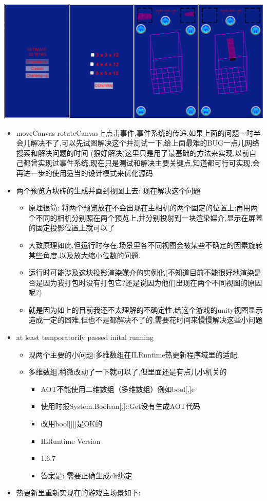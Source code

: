 \documentclass[9pt, b5paper]{article}
\begin{document}
\includegraphics[width=.9\linewidth]{./pic/readme_20221022_223927.png}
\begin{itemize}
\item moveCanvas rotateCanvas上点击事件,事件系统的传递.如果上面的问题一时半会儿解决不了,可以先试图解决这个并测试一下,给上面最难的BUG一点儿网络搜索和解决问题的时间 (狠好解决)这里只是用了最基础的方法来实现,以前自己都曾实现过事件系统,现在只是测试和解决主要关键点,知道都可行可实现,会再进一步的使用适当的设计模式来优化源码
\item 两个预览方块砖的生成并画到视图上去: 现在解决这个问题
\begin{itemize}
\item 原理很简: 将两个预览放在不会出现在主相机的两个固定的位置上;再用两个不同的相机分别照在两个预览上,并分别投射到一块渲染媒介,显示在屏幕的固定投影位置上就可以了
\item 大致原理如此,但运行时存在:场景里各不同视图会被某些不确定的因素旋转某些角度,以及放大缩小位数的问题.
\item 运行时可能涉及这块投影渲染媒介的实例化(不知道目前不能很好地渲染是否是因为我打包时没有打包它?还是说因为他们出现在两个不同视图的原因呢?)
\item 就是因为如上的目前我还不太理解的不确定性,给这个游戏的unity视图显示造成一定的困难,但也不是都解决不了的,需要花时间来慢慢解决这些小问题
\end{itemize}
\item at least temporatorily passed inital running 
\begin{itemize}
\item 现两个主要的小问题:多维数组在ILRuntime热更新程序域里的适配,
\item 多维数组,稍微改动了一下就可以了,但里面还是有点儿小机关的
\begin{itemize}
\item AOT不能使用二维数组（多维数组）例如bool[,]e
\item 使用时报System.Boolean[,]::Get没有生成AOT代码
\item 改用bool[][]是OK的
\item ILRuntime Version
\item 1.6.7
\item 答案是: 需要正确生成clr绑定
\end{itemize}
\end{itemize}
\item 热更新里重新实现在的游戏主场景如下:
\end{itemize}
\end{document}
